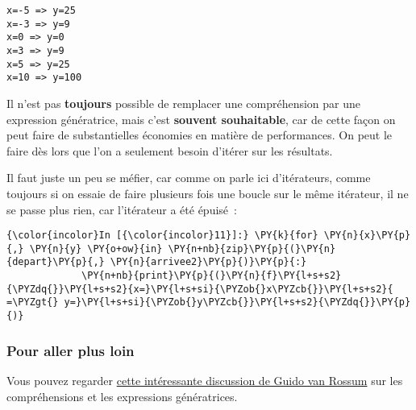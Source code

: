     \begin{Verbatim}[commandchars=\\\{\},frame=single,framerule=0.3mm,rulecolor=\color{cellframecolor}]
x=-5 => y=25
x=-3 => y=9
x=0 => y=0
x=3 => y=9
x=5 => y=25
x=10 => y=100
\end{Verbatim}

    Il n'est pas \textbf{toujours} possible de remplacer une compréhension
par une expression génératrice, mais c'est \textbf{souvent souhaitable},
car de cette façon on peut faire de substantielles économies en matière
de performances. On peut le faire dès lors que l'on a seulement besoin
d'itérer sur les résultats.

    Il faut juste un peu se méfier, car comme on parle ici d'itérateurs,
comme toujours si on essaie de faire plusieurs fois une boucle sur le
même itérateur, il ne se passe plus rien, car l'itérateur a été épuisé~:

    \begin{Verbatim}[commandchars=\\\{\},frame=single,framerule=0.3mm,rulecolor=\color{cellframecolor}]
{\color{incolor}In [{\color{incolor}11}]:} \PY{k}{for} \PY{n}{x}\PY{p}{,} \PY{n}{y} \PY{o+ow}{in} \PY{n+nb}{zip}\PY{p}{(}\PY{n}{depart}\PY{p}{,} \PY{n}{arrivee2}\PY{p}{)}\PY{p}{:}
             \PY{n+nb}{print}\PY{p}{(}\PY{n}{f}\PY{l+s+s2}{\PYZdq{}}\PY{l+s+s2}{x=}\PY{l+s+si}{\PYZob{}x\PYZcb{}}\PY{l+s+s2}{ =\PYZgt{} y=}\PY{l+s+si}{\PYZob{}y\PYZcb{}}\PY{l+s+s2}{\PYZdq{}}\PY{p}{)}
\end{Verbatim}


    \hypertarget{pour-aller-plus-loin}{%
\subsubsection{Pour aller plus loin}\label{pour-aller-plus-loin}}

    Vous pouvez regarder
\href{http://python-history.blogspot.fr/2010/06/from-list-comprehensions-to-generator.html}{cette
intéressante discussion de Guido van Rossum} sur les compréhensions et
les expressions génératrices.


    
    
    
